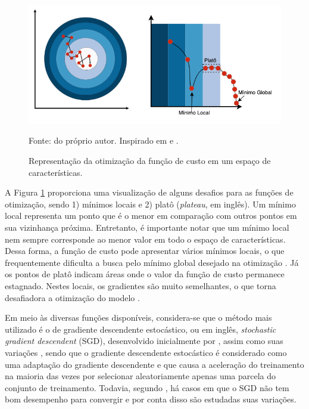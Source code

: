 \begin{figure}[H]
    \centering
    \caption[Otimização da função de custo.]{Representação da otimização da função de custo em um espaço de características.}
    \includegraphics[width=1\linewidth]{recursos/imagens/deep/funcao_otimizacao.png}
    \label{deep:fig:otimizacao}

    Fonte: do próprio autor. Inspirado em \cite{MontesinosLopez2022ArtificialOutcomes} e \cite{Geron2017Hands-onSystems}.
\end{figure}


A Figura \ref{deep:fig:otimizacao} proporciona uma visualização de alguns desafios para as funções de otimização, sendo 1) mínimos locais e 2) platô (\textit{plateau}, em inglês). Um mínimo local representa um ponto que é o menor em comparação com outros pontos em sua vizinhança próxima. Entretanto, é importante notar que um mínimo local nem sempre corresponde ao menor valor em todo o espaço de características. Dessa forma, a função de custo pode apresentar vários mínimos locais, o que frequentemente dificulta a busca pelo mínimo global desejado na otimização \citep{Goodfellow2016}. Já os pontos de platô indicam áreas onde o valor da função de custo permanece estagnado. Nestes locais, os gradientes são muito semelhantes, o que torna desafiadora a otimização do modelo \citep{Goodfellow2016}.

Em meio às diversas funções disponíveis, considera-se que o método mais utilizado é o de gradiente descendente estocástico, ou em inglês, \textit{stochastic gradient descendent} (SGD), desenvolvido inicialmente por \cite{cauchy1847methode}, assim como suas variações \citep{Goodfellow2016}, sendo que o gradiente descendente estocástico é considerado como uma adaptação do gradiente descendente e que causa a aceleração do treinamento na maioria das vezes por selecionar aleatoriamente apenas uma parcela do conjunto de treinamento. Todavia, segundo \cite{Goodfellow2016}, há casos em que o SGD não tem bom desempenho para convergir e por conta disso são estudadas suas variações.

